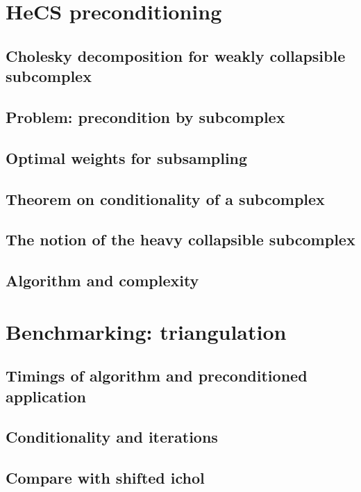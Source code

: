 \section{ HeCS preconditioning }

\subsection{ Cholesky decomposition for weakly collapsible subcomplex }

\subsection{ Problem: precondition by subcomplex }


\subsection{ Optimal weights for subsampling }


\subsection{ Theorem on conditionality of a subcomplex }


\subsection{ The notion of the heavy collapsible subcomplex }


\subsection{ Algorithm and complexity }









\section{Benchmarking: triangulation}

\subsection{ Timings of algorithm and preconditioned application }

\subsection{ Conditionality and iterations }


\subsection{ Compare with shifted ichol }








